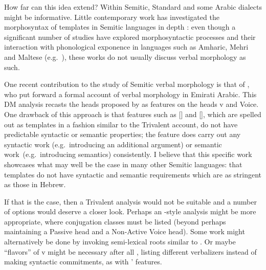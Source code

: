 \begin{exe}
\begin{xlist}
\begin{xlist}
\begin{xlist}
\begin{xlist}
\begin{xlist}
\begin{xlist}
\begin{exe}
\begin{xlist}
\begin{exe}
\begin{exe}
\begin{xlist}
\begin{exe}
\begin{exe}
\begin{xlist}
\begin{exe}
\begin{xlist}
\begin{exe}
\begin{xlist}
\begin{exe}
\begin{xlist}
\begin{exe}
\begin{xlist}
How far can this idea extend? Within Semitic, Standard  and some Arabic dialects might be informative. Little contemporary work has investigated the morphosyntax of templates in Semitic languages in depth \citep{kastnertucker19cup}: even though a significant number of studies have explored morphosyntactic processes and their interaction with phonological exponence in languages such as Amharic, Mehri and Maltese (e.g.~\citealt{kramer14,kramer16li,doronkhan16,faust16,faust18gjgl,faust19,rood17phd,winchester17nels,winchester19phd,kalin18,akkus19jl}), these works do not usually discuss verbal morphology as such.

One recent contribution to the study of Semitic verbal morphology is that of \cite{alkaabintelitheos19}, who put forward a formal account of verbal morphology in Emirati Arabic. This DM analysis recasts the heads proposed by \cite{doron03} as features on the heads v and Voice. One drawback of this approach is that features such as [] and [], which are spelled out as templates in a fashion similar to the Trivalent account, do not have predictable syntactic or semantic properties; the  feature does carry out any syntactic work (e.g.~introducing an additional argument) or semantic work~(e.g.~introducing  semantics) consistently. I believe that this specific work showcases what may well be the case in many other Semitic languages: that templates do not have syntactic and semantic requirements which are as stringent as those in Hebrew.

If that is the case, then a Trivalent analysis would not be suitable and a number of options would deserve a closer look. Perhaps an \citeauthor{arad05}-style analysis might be more appropriate, where conjugation classes must be listed (beyond perhaps maintaining a Passive head and a Non-Active Voice head). Some work might alternatively be done by invoking semi-lexical roots similar to {\va}. Or maybe ``flavors'' of v might be necessary after all \citep{katie13}, listing different verbalizers instead of making syntactic commitments, as with \citeauthor{alkaabintelitheos19}' features.


\end{xlist}
\end{exe}
\end{xlist}
\end{exe}
\end{xlist}
\end{exe}
\end{xlist}
\end{exe}
\end{xlist}
\end{exe}
\end{exe}
\end{xlist}
\end{exe}
\end{exe}
\end{xlist}
\end{exe}
\end{xlist}
\end{xlist}
\end{xlist}
\end{xlist}
\end{xlist}
\end{xlist}
\end{exe}
